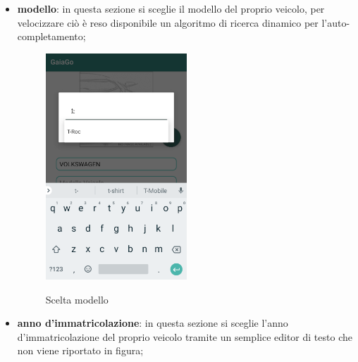 \begin{itemize}
\item \textbf{modello}: in questa sezione si sceglie il modello del proprio veicolo, per velocizzare ciò è reso disponibile un algoritmo di ricerca dinamico per l'auto-completamento;
 \begin{figure}[H] 
	\centering 
	\includegraphics[width=0.5\textwidth]{res/images/modello_auto.png}\\
	\caption{Scelta modello}
	\label{modello}
\end{figure}

\item \textbf{anno d'immatricolazione}: in questa sezione si sceglie l'anno d'immatricolazione del proprio veicolo tramite un semplice editor di testo che non viene riportato in figura;
\pagebreak


\end{itemize}
